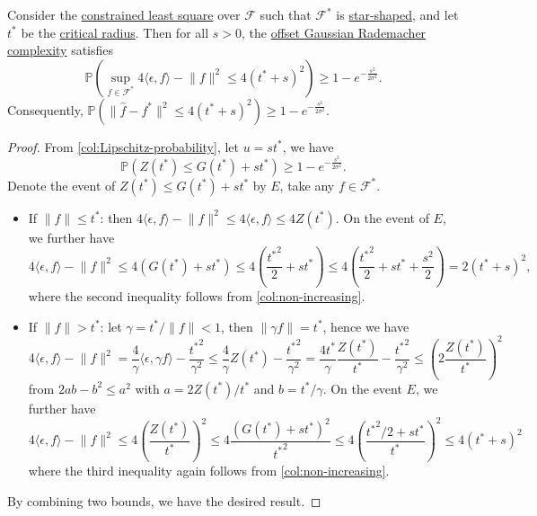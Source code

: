 \begin{theorem}\label{thm:non-asymptotic-bound-on-constrained-LS-offset}
	Consider the \hyperref[prb:constrained-LS]{constrained least square} over \(\mathscr{F} \) such that \(\mathscr{F} ^{\ast} \) is \hyperref[def:star-shaped]{star-shaped}, and let \(t^{\ast} \) be the \hyperref[def:critical-radius]{critical radius}. Then for all \(s > 0\), the \hyperref[def:offset-Gaussian-Rademacher-complexity]{offset Gaussian Rademacher complexity} satisfies
	\[
		\mathbb{P} \left( \sup _{f\in \mathscr{F} ^{\ast} } 4 \langle \epsilon , f \rangle - \lVert f \rVert ^2 \leq 4 (t^{\ast} + s)^2 \right) \geq 1 - e^{-\frac{s^2}{2\sigma ^2}}.
	\]
	Consequently, \(\mathbb{P} ( \lVert \hat{f} - f^{\ast} \rVert ^2 \leq 4 (t^{\ast} + s)^2 ) \geq 1 - e^{-\frac{s^2}{2\sigma ^2}}\).
\end{theorem}
\begin{proof}
	From \autoref{col:Lipschitz-probability}, let \(u = s t^{\ast} \), we have
	\[
		\mathbb{P} \left( Z(t^{\ast} ) \leq G(t^{\ast} ) + s  t^{\ast}  \right) \geq 1 - e^{- \frac{s^2}{2\sigma ^2}}.
	\]
	Denote the event of \(Z(t^{\ast} ) \leq G(t^{\ast} ) + s t^{\ast} \) by \(E\), take any \(f \in \mathscr{F} ^{\ast} \).
	\begin{itemize}
		\item If \(\lVert f \rVert \leq t^{\ast} \): then \(4 \langle \epsilon , f \rangle - \lVert f \rVert ^2 \leq 4 \langle \epsilon , f \rangle \leq 4 Z(t^{\ast} )\). On the event of \(E\), we further have
		      \[
			      4 \langle \epsilon , f \rangle - \lVert f \rVert ^2
			      \leq 4 (G(t^{\ast} ) + s t^{\ast} )
			      \leq 4 \left( \frac{{t^{\ast} }^2}{2} + s  t^{\ast} \right)
			      \leq 4 \left( \frac{{t^{\ast} }^2}{2} + s  t^{\ast} + \frac{s^2}{2}\right)
			      = 2(t^{\ast} + s)^2,
		      \]
		      where the second inequality follows from \autoref{col:non-increasing}.
		\item If \(\lVert f \rVert > t^{\ast} \): let \(\gamma = t^{\ast} / \lVert f \rVert < 1\), then \(\lVert \gamma f \rVert = t^{\ast} \), hence we have
		      \[
			      4 \langle \epsilon , f \rangle - \lVert f \rVert ^2
			      = \frac{4}{\gamma } \langle \epsilon , \gamma f \rangle - \frac{{t^{\ast} }^2}{\gamma ^2}
			      \leq \frac{4}{\gamma } Z(t^{\ast} ) - \frac{{t^{\ast} }^2}{\gamma ^2}
			      = \frac{4 t^{\ast} }{\gamma }  \frac{Z(t^{\ast} )}{t^{\ast} } - \frac{{t^{\ast} }^2}{\gamma ^2}
			      \leq \left(2 \frac{Z(t^{\ast} )}{t^{\ast} } \right) ^2
		      \]
		      from \(2ab - b^2 \leq a^2\) with \(a = 2 Z(t^{\ast} ) / t^{\ast} \) and \(b = t^{\ast} / \gamma \). On the event \(E\), we further have
		      \[
			      4 \langle \epsilon , f \rangle - \lVert f \rVert ^2
			      \leq 4 \left( \frac{Z(t^{\ast} )}{t^{\ast} } \right) ^2
			      \leq 4 \frac{( G(t^{\ast} ) + s t^{\ast} )^2}{{t^{\ast} }^2}
			      \leq 4 \left( \frac{{t^{\ast} }^2 / 2 + s t^{\ast} }{t^{\ast} } \right) ^2
			      \leq 4 ( t^{\ast} + s)^2
		      \]
		      where the third inequality again follows from \autoref{col:non-increasing}.
	\end{itemize}
	By combining two bounds, we have the desired result.
\end{proof}

